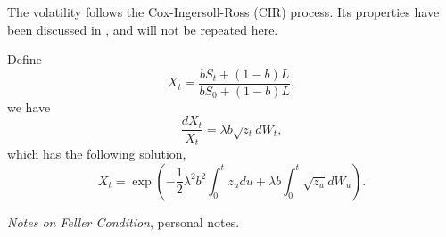 \documentclass[12pt]{article}
\begin{document}
  The volatility follows the Cox-Ingersoll-Ross (CIR) process. Its properties have
  been discussed in \cite{Feller}, and will not be repeated here.

  Define
  \begin{equation}
    X_t=\frac{bS_t+\left(1-b\right)L}{bS_0+\left(1-b\right)L},
  \end{equation}
  we have
  \begin{equation}
    \frac{dX_t}{X_t}=\lambda b\sqrt{z_t}dW_t,
  \end{equation}
  which has the following solution,
  \begin{equation}
    X_t=\exp\left(-\frac{1}{2}\lambda^2b^2\int_0^tz_udu+\lambda b\int_0^t\sqrt{z_u}dW_u\right).
  \end{equation}


\begin{thebibliography}{99}
    {\it Notes on Feller Condition}, personal notes.

\end{thebibliography}
\end{document}
